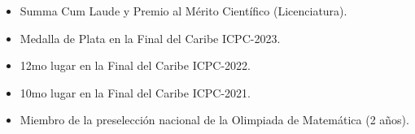 \begin{itemize}
    \item Summa Cum Laude y Premio al Mérito Científico (Licenciatura).
    \item Medalla de Plata en la Final del Caribe ICPC-2023.
    \item 12mo lugar en la Final del Caribe ICPC-2022.
    \item 10mo lugar en la Final del Caribe ICPC-2021.
    \item Miembro de la preselección nacional de la Olimpiada de Matemática (2 años).

\end{itemize}

\medskip


